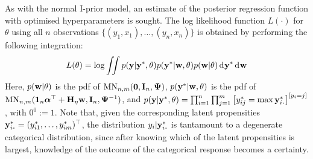 
As with the normal I-prior model, an estimate of the posterior regression function with optimised hyperparameters is sought.
The log likelihood function $L(\cdot)$ for $\theta$ using all $n$ observations $\{(y_1,x_1),\dots,(y_n,x_n)\}$ is obtained by performing the following integration:
\begin{equation}\label{eq:iprobitlik}
  L(\theta) 
  = \log \iint p({\mathbf y}|{\mathbf y}^*,\theta) p({\mathbf y}^*|{\mathbf w},\theta) p({\mathbf w}|\theta) \operatorname{d}\hspace{0.5pt}\! {\mathbf y}^* \operatorname{d}\hspace{0.5pt}\! {\mathbf w}  
\end{equation}
Here, $p({\mathbf w}|\theta)$ is the pdf of $\operatorname{MN}_{n,m}({\mathbf 0},{\mathbf I}_n,{\bm\Psi})$, $p({\mathbf y}^*|{\mathbf w},\theta)$ is the pdf of $\operatorname{MN}_{n,m}({\mathbf 1}_n{\bm\alpha}^\top + {\mathbf H}_\eta{\mathbf w},{\mathbf I}_n,{\bm\Psi}^{-1})$, and $p(\by|\by^*,\theta) = \prod_{i=1}^n \prod_{j=1}^m \big[y_{ij}^* 
    = \max \by^*_{i\bigcdot}\big]^{[y_i = j]}$, with $0^0 := 1$.
Note that, given the corresponding latent propensities $\by^*_{i\bigcdot} = (y_{i1}^*,\dots,y_{im}^*)^\top$, the distribution $y_i|\by^*_{i\bigcdot}$ is tantamount to a degenerate categorical distribution, since after knowing which of the latent propensities is largest, knowledge of the outcome of the categorical response becomes a certainty.


